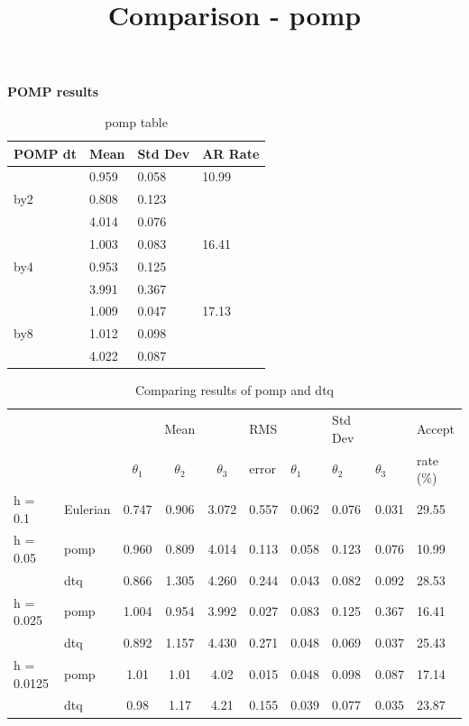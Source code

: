 \documentclass[a4paper,11pt]{article}
\begin{document}
\pagestyle{empty}
\title{Comparison - pomp}
\begin{center}
\Large\textbf{POMP results} \\[11pt]
\normalsize
\end{center}

\begin{table}[H]
\centering
\caption{pomp table}
\begin{tabular}{|l|l|l|l|}
\hline
POMP dt & Mean & Std Dev    & AR Rate \\ \hline
     & 0.959 & 0.058 & 10.99           \\
by2  & 0.808 & 0.123  &                 \\
     & 4.014  & 0.076 &                 \\ \hline
     & 1.003  & 0.083 & 16.41           \\
by4  & 0.953 & 0.125   &                 \\
     & 3.991  & 0.367  &                 \\ \hline
     & 1.009  & 0.047   & 17.13           \\
by8  & 1.012  & 0.098 &                 \\
     & 4.022  & 0.087 &                 \\ \hline
\end{tabular}
\end{table}

\begin{table}[H]
\centering
\caption{Comparing results of pomp and dtq}
\begin{tabular}{|ll|c|c|c|l|l|l|l|l|}
\hline
                                 &          &        & Mean   &        & RMS &        & Std Dev &        & Accept \\ \cline{3-5} \cline{7-9}
                                 &          & $\theta_1$ & $\theta_2$ & $\theta_3$ & error & $\theta_1$ & $\theta_2$  & $\theta_3$ & rate (\%)  \\ \hline
\multicolumn{1}{|l|}{h = 0.1}    & Eulerian & 0.747  & 0.906  & 3.072  & 0.557     & 0.062  & 0.076   & 0.031  & 29.55   \\ \hline
\multicolumn{1}{|l|}{h = 0.05}   & pomp     & 0.960  & 0.809  & 4.014  & 0.113     & 0.058  & 0.123   & 0.076  & 10.99   \\ \cline{2-10} 
\multicolumn{1}{|l|}{}           & dtq      & 0.866  & 1.305  & 4.260  & 0.244     & 0.043  & 0.082   & 0.092  & 28.53   \\ \hline
\multicolumn{1}{|l|}{h = 0.025}  & pomp     & 1.004  & 0.954  & 3.992  & 0.027     & 0.083  & 0.125   & 0.367  & 16.41   \\ \cline{2-10} 
\multicolumn{1}{|l|}{}           & dtq      & 0.892  & 1.157  & 4.430  & 0.271     & 0.048  & 0.069   & 0.037  & 25.43   \\ \hline
\multicolumn{1}{|l|}{h = 0.0125} & pomp     & 1.01   & 1.01   & 4.02   & 0.015     & 0.048  & 0.098   & 0.087  & 17.14   \\ \cline{2-10} 
\multicolumn{1}{|l|}{}           & dtq      & 0.98   & 1.17   & 4.21   & 0.155     & 0.039  & 0.077   & 0.035  & 23.87   \\ \hline
\end{tabular}
\end{table}
\end{document}

